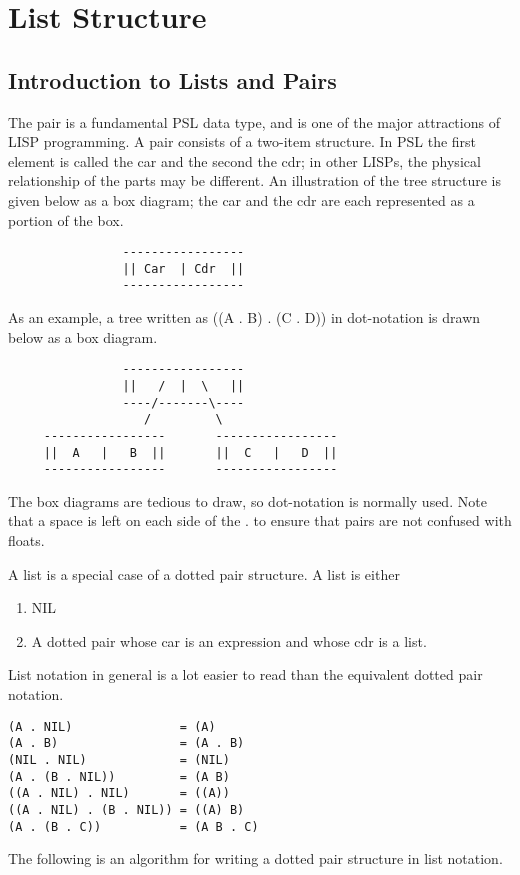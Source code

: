 
\chapter{List Structure}

\section{Introduction to Lists and Pairs}

  The  pair  is  a  fundamental PSL data type, and is one of the
major attractions of LISP programming.  A  pair  consists  of  a
two-item  structure.  In PSL the first element is called the car
and  the  second  the  cdr;  in  other   LISPs,   the   physical
relationship  of the parts may be different.  An illustration of
the tree structure is given below as a box diagram; the car  and
the cdr are each represented as a portion of the box.

\begin{verbatim}
                -----------------
                || Car  | Cdr  ||
                -----------------
\end{verbatim}
As  an  example,  a  tree    written  as  ((A . B) . (C . D)) in
dot-notation is drawn below as a box diagram.

\begin{verbatim}
                -----------------
                ||   /  |  \   ||
                ----/-------\----
                   /         \
     -----------------       -----------------
     ||  A   |   B  ||       ||  C   |   D  ||
     -----------------       -----------------
\end{verbatim}
  The box diagrams are  tedious  to  draw,  so  dot-notation  is
normally  used.  Note that a space is left on each side of the .
to ensure that pairs are not confused with floats.

  A list is a special case of a dotted pair structure.   A  list
is either


\begin{enumerate}
\item  NIL
\item  A dotted pair whose car is an expression and whose cdr is a
     list.
\end{enumerate}
List  notation  in  general  is  a  lot  easier to read than the
equivalent dotted pair notation.

\begin{verbatim}
(A . NIL)               = (A)
(A . B)                 = (A . B)
(NIL . NIL)             = (NIL)
(A . (B . NIL))         = (A B)
((A . NIL) . NIL)       = ((A))
((A . NIL) . (B . NIL)) = ((A) B)
(A . (B . C))           = (A B . C)
\end{verbatim}
  The following is  an  algorithm  for  writing  a  dotted  pair
structure in list notation.


